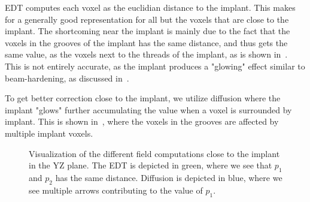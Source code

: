 EDT computes each voxel as the euclidian distance to the implant. 
This makes for a generally good representation for all but the voxels that are close to the implant.
The shortcoming near the implant is mainly due to the fact that the voxels in the grooves of the implant has the same distance, and thus gets the same value, as the voxels next to the threads of the implant, as is shown in~.
This is not entirely accurate, as the implant produces a "glowing" effect similar to beam-hardening, as discussed in~.

To get better correction close to the implant, we utilize diffusion where the implant "glows" further accumulating the value when a voxel is surrounded by implant.
This is shown in~, where the voxels in the grooves are affected by multiple implant voxels.

\begin{figure}
    \vspace{-1.5cm}
    \centering
      \vspace{-3.5cm}
    \caption{Visualization of the different field computations close to the implant in the YZ plane. The EDT is depicted in green, where we see that $p_1$ and $p_2$ has the same distance. Diffusion is depicted in blue, where we see multiple arrows contributing to the value of $p_1$.}
    \label{fig:edt-vs-diffusion}
\end{figure}

